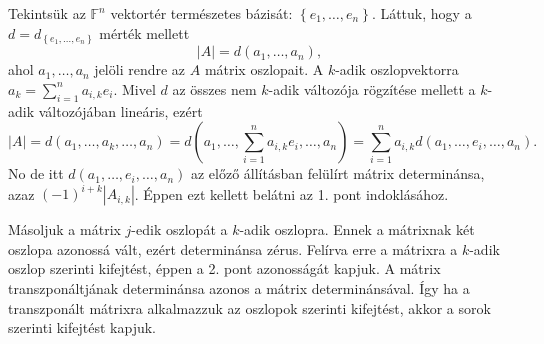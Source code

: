 \documentclass[9pt, a4paper, showtrims]{memoir}
\makeatletter
\renewenvironment{proof}[1][\proofname]
    {\par\pushQED{\qed}%
    \normalfont \topsep6\p@\@plus6\p@\relax
    \trivlist
    \item[\hskip\labelsep
        \itshape
    #1\@addpunct{:}]\ignorespaces}
    {\popQED\endtrivlist\@endpefalse}
\theoremstyle{plain}
\theoremstyle{remark}
\theoremstyle{definition}
\makeatother
\begin{document}
\begin{proof}
    Tekintsük az $\mathbb{F}^n$ vektortér természetes bázisát: 
    $\left\{e_1,\dots,e_n\right\}$. Láttuk, hogy a $d=d_{\left\{ e_1,\dots,e_n\right\}}$
    mérték mellett 
    \[
        |A|=d\left( a_1,\dots,a_n \right),
    \]
    ahol $a_1,\dots,a_n$ jelöli rendre az $A$ mátrix oszlopait.
    A $k$-adik oszlopvektorra $a_k=\sum_{i=1}^na_{i,k}e_i$. 
    Mivel $d$ az összes nem $k$-adik változója rögzítése mellett a $k$-adik változójában lineáris,
    ezért
    \[
        |A|=d\left( a_1,\dots,a_k,\dots,a_n \right)
        =
        d\left( a_1,\dots,\sum_{i=1}^na_{i,k}e_i,\dots,a_n \right)
        =
        \sum_{i=1}^na_{i,k}d(a_1,\dots,e_i,\dots,a_n).
    \]
    No de itt $d(a_1,\dots,e_i,\dots,a_n)$ az előző állításban felülírt mátrix determinánsa,
    azaz $\left( -1 \right)^{i+k}|A_{i,k}|$.
    Éppen ezt kellett belátni az 1. pont indoklásához.

    Másoljuk a mátrix $j$-edik oszlopát a $k$-adik oszlopra.
    Ennek a mátrixnak két oszlopa azonossá vált,
    ezért determinánsa zérus.
    Felírva erre a mátrixra a $k$-adik oszlop szerinti kifejtést,
    éppen a 2. pont azonosságát kapjuk.
\end{proof}
A mátrix transzponáltjának determinánsa azonos a mátrix determinánsával.
Így ha a transzponált mátrixra alkalmazzuk az oszlopok szerinti kifejtést,
akkor a sorok szerinti kifejtést kapjuk.
\end{document}
